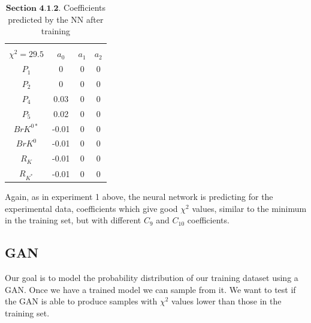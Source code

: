 \documentclass[a4paper,fleqn]{cas-dc}
\begin{document}
\begin{table}
	\begin{tabular}{ |c|c|c|c|  } 
		\hline
		\small
		\makecell{\(C_9 = -0.79\), \(C_{10} = -0.07\) \\ \(\chi^2 = 29.5 \)}\normalsize
		& \textbf{\(a_0\)} & \textbf{\(a_1\)} & \textbf{\(a_2\)}\\
		\hline
		\(P_1\) & 0 & 0 &  0 \\
		\hline
		\(P_2\) & 0 & 0 & 0 \\	
		\hline
		\(P_4\) & 0.03 & 0 &	0 \\
		\hline
		\(P_5\) & 0.02 &   0 &   0 \\		
		\hline
		\(BrK^{0*}\) & -0.01 & 0 & 0 \\		
		\hline
		\(BrK^{0}\) & -0.01 & 0 & 0 \\		
		\hline	
		\(R_{K}\) & -0.01 & 0 & 0 \\
		\hline	
		\(R_{K^*}\) & -0.01 & 0 & 0 \\		
		\hline
	\end{tabular}
	\caption{\label{tab:NNExp2NNPrediction} \(\textbf{Section 4.1.2.}\) Coefficients predicted by the NN after training}
\end{table}

Again, as in experiment 1 above, the neural network is predicting for the experimental data, coefficients which give good \(\chi^2 \) values, similar to the minimum in the training set, but with different \(C_9\) and \(C_{10}\) coefficients.

\subsection{GAN}
Our goal is to model the probability distribution of our training dataset using a GAN. Once we have a trained model we can sample from it.  We want to test if the GAN is able to produce samples with \(\chi^2 \) values lower than those in the training set.
\end{document}
